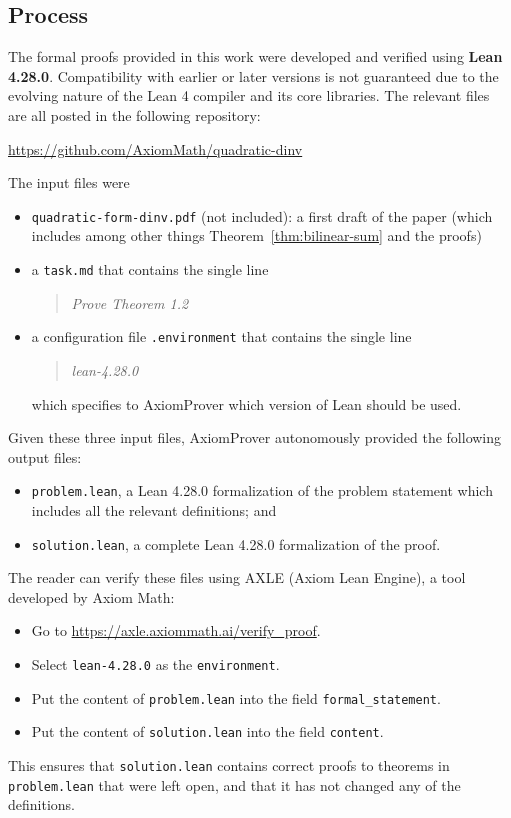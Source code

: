 \documentclass[11pt,reqno]{amsart}
\theoremstyle{remark}
\begin{document}
\subsection*{Process}
The formal proofs provided in this work were developed and verified using \textbf{Lean 4.28.0}.
Compatibility with earlier or later versions is not guaranteed due to the evolving nature of the Lean 4 compiler and its core libraries.
The relevant files are all posted in the following repository:
\begin{center}
  \url{https://github.com/AxiomMath/quadratic-dinv}
\end{center}
The input files were
\begin{itemize}
  \item \texttt{quadratic-form-dinv.pdf} (not included): a first draft of the paper (which includes among other things Theorem~\ref{thm:bilinear-sum} and the proofs)
  \item a \texttt{task.md} that contains the single line
  \begin{quote}
    \slshape
    Prove Theorem 1.2
  \end{quote}
  \item a configuration file \texttt{.environment} that contains the single line
  \begin{quote}
    \slshape
    lean-4.28.0
  \end{quote}
  which specifies to AxiomProver which version of Lean should be used.
\end{itemize}
Given these three input files,
AxiomProver autonomously provided the following output files:
\begin{itemize}
  \item \texttt{problem.lean}, a Lean 4.28.0 formalization of the problem statement
which includes all the relevant definitions; and
  \item \texttt{solution.lean}, a complete Lean 4.28.0 formalization of the proof.
\end{itemize}

\medskip

The reader can verify these files using AXLE (Axiom Lean Engine), a tool developed by Axiom Math:
\begin{itemize}
\item Go to \url{https://axle.axiommath.ai/verify_proof}.
\item Select \texttt{lean-4.28.0} as the \texttt{environment}.
\item Put the content of \texttt{problem.lean} into the field \texttt{formal\_statement}.
\item Put the content of \texttt{solution.lean} into the field \texttt{content}.
\end{itemize}
This ensures that \texttt{solution.lean} contains correct proofs to theorems in \texttt{problem.lean} that were left open, and that it has not changed any of the definitions.
\end{document}
